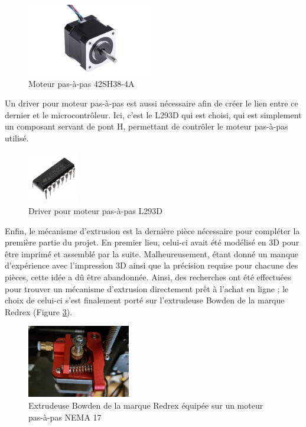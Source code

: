 \begin{figure}[H]
    \centering
    \includegraphics[width=0.5\textwidth]{images/42SH38-4A.png}
    \caption{Moteur pas-à-pas 42SH38-4A}
    \label{fig:42SH38-4A}
\end{figure}

\par Un driver pour moteur pas-à-pas est aussi nécessaire afin de créer le lien entre ce dernier et le microcontrôleur. Ici, c'est le L293D qui est choisi, qui est simplement un composant servant de pont H, permettant de contrôler le moteur pas-à-pas utilisé.

\begin{figure}[H]
    \centering
    \includegraphics[width=0.2\textwidth]{images/L293D.jpg}
    \caption{Driver pour moteur pas-à-pas L293D}
    \label{fig:L293D}
\end{figure}

\par Enfin, le mécanisme d'extrusion est la dernière pièce nécessaire pour compléter la première partie du projet. En premier lieu, celui-ci avait été modélisé en 3D pour être imprimé et assemblé par la suite. Malheureusement, étant donné un manque d'expérience avec l'impression 3D ainsi que la précision requise pour chacune des pièces, cette idée a dû être abandonnée. Ainsi, des recherches ont été effectuées pour trouver un mécanisme d'extrusion directement prêt à l'achat en ligne ; le choix de celui-ci s'est finalement porté sur l'extrudeuse Bowden de la marque Redrex (Figure \ref{fig:redrex}).

\begin{figure}[H]
    \centering
    \includegraphics[width=0.4\textwidth]{images/redrex.jpg}
    \caption{Extrudeuse Bowden de la marque Redrex équipée sur un moteur pas-à-pas NEMA 17}
    \label{fig:redrex}
\end{figure}

